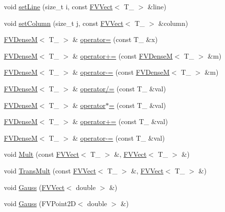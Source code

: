 \begin{DoxyCompactItemize}
\item 
void \hyperlink{classFVDenseM_a9441579962fe169d09d5fd504388da1a}{setLine} (size\_\-t i, const \hyperlink{classFVVect}{FVVect}$<$ T\_\- $>$ \&line)
\item 
void \hyperlink{classFVDenseM_a888ffa88e606f11b989361ef3b1176b6}{setColumn} (size\_\-t j, const \hyperlink{classFVVect}{FVVect}$<$ T\_\- $>$ \&column)
\item 
\hyperlink{classFVDenseM}{FVDenseM}$<$ T\_\- $>$ \& \hyperlink{classFVDenseM_a06daa883e8e99590868bfd95689d638b}{operator=} (const T\_\- \&x)
\item 
\hyperlink{classFVDenseM}{FVDenseM}$<$ T\_\- $>$ \& \hyperlink{classFVDenseM_a1beab84f76baeed61a89633796b6cc29}{operator+=} (const \hyperlink{classFVDenseM}{FVDenseM}$<$ T\_\- $>$ \&m)
\item 
\hyperlink{classFVDenseM}{FVDenseM}$<$ T\_\- $>$ \& \hyperlink{classFVDenseM_afb8664e2aaa7a8897ee8aef014a494da}{operator-\/=} (const \hyperlink{classFVDenseM}{FVDenseM}$<$ T\_\- $>$ \&m)
\item 
\hyperlink{classFVDenseM}{FVDenseM}$<$ T\_\- $>$ \& \hyperlink{classFVDenseM_aa5ac6333bf08dddc27d45d6f7ddb79c9}{operator/=} (const T\_\- \&val)
\item 
\hyperlink{classFVDenseM}{FVDenseM}$<$ T\_\- $>$ \& \hyperlink{classFVDenseM_ac8084800d4aa148e541d0b00412180df}{operator$\ast$=} (const T\_\- \&val)
\item 
\hyperlink{classFVDenseM}{FVDenseM}$<$ T\_\- $>$ \& \hyperlink{classFVDenseM_aaf2cfed3edf8bd21a0830ddf20c61462}{operator+=} (const T\_\- \&val)
\item 
\hyperlink{classFVDenseM}{FVDenseM}$<$ T\_\- $>$ \& \hyperlink{classFVDenseM_ad8aa01530a594eb81c92744755f07a4e}{operator-\/=} (const T\_\- \&val)
\item 
void \hyperlink{classFVDenseM_a75a2ced8980671cf0a67b6fdd5ededb5}{Mult} (const \hyperlink{classFVVect}{FVVect}$<$ T\_\- $>$ \&, \hyperlink{classFVVect}{FVVect}$<$ T\_\- $>$ \&)
\item 
void \hyperlink{classFVDenseM_a51effb20cd7b29168e5f8eb0a96067a0}{TransMult} (const \hyperlink{classFVVect}{FVVect}$<$ T\_\- $>$ \&, \hyperlink{classFVVect}{FVVect}$<$ T\_\- $>$ \&)
\item 
void \hyperlink{classFVDenseM_aea5f8e6172b2bc847ebe020b047508f6}{Gauss} (\hyperlink{classFVVect}{FVVect}$<$ double $>$ \&)
\item 
void \hyperlink{classFVDenseM_a24fe34cc0ea853e2b1db3a67af13a7d8}{Gauss} (FVPoint2D$<$ double $>$ \&)
\item 

\end{DoxyCompactItemize}
